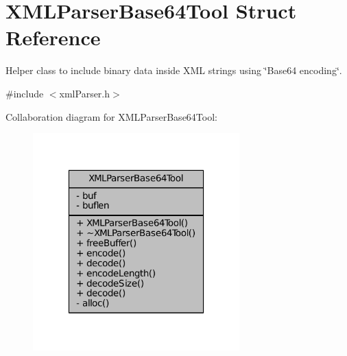 \hypertarget{structXMLParserBase64Tool}{\section{X\-M\-L\-Parser\-Base64\-Tool Struct Reference}
\label{structXMLParserBase64Tool}
}


Helper class to include binary data inside X\-M\-L strings using \char`\"{}\-Base64 encoding\char`\"{}.  




{\ttfamily \#include $<$xml\-Parser.\-h$>$}



Collaboration diagram for X\-M\-L\-Parser\-Base64\-Tool\-:
\nopagebreak
\begin{figure}[H]
\begin{center}
\leavevmode
\includegraphics[width=226pt]{structXMLParserBase64Tool__coll__graph}
\end{center}
\end{figure}
